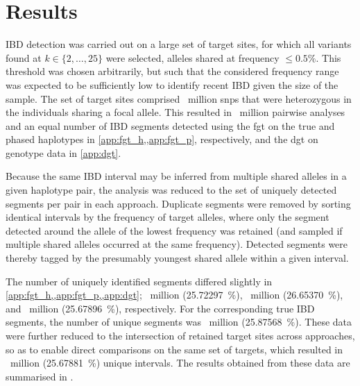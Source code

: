 %
\section{Results}\label{sec:ibd_results}
%

IBD detection was carried out on a large set of target sites, for which all \fk{} variants found at ${k \in \lbrace 2, \ldots, 25 \rbrace}$ were selected, \ie alleles shared at frequency ${\leq 0.5\%}$.
This threshold was chosen arbitrarily, but such that the considered frequency range was expected to be sufficiently low to identify recent IBD given the size of the sample.
The set of target sites comprised ~million \glspl{snp} that were heterozygous in the individuals sharing a focal allele.
This resulted in ~million pairwise analyses and an equal number of IBD segments detected using the \gls{fgt} on the true and phased haplotypes in \cref{app:fgt_h,,app:fgt_p}, respectively, and the \gls{dgt} on genotype data in \cref{app:dgt}.

Because the same IBD interval may be inferred from multiple shared alleles in a given haplotype pair, the analysis was reduced to the set of uniquely detected segments per pair in each approach.
Duplicate segments were removed by sorting identical intervals by the frequency of target alleles, where only the segment detected around the allele of the lowest frequency was retained (and sampled if multiple shared alleles occurred at the same frequency).
Detected segments were thereby tagged by the presumably youngest shared allele within a given interval.

The number of uniquely identified segments differed slightly in \cref{app:fgt_h,,app:fgt_p,,app:dgt};
~million (\SI{25.72297}{\percent}),
~million (\SI{26.65370}{\percent}), and
~million (\SI{25.67896}{\percent}), respectively.
For the corresponding true IBD segments, the number of unique segments was ~million (\SI{25.87568}{\percent}).
These data were further reduced to the intersection of retained target sites across approaches, so as to enable direct comparisons on the same set of targets, which resulted in ~million (\SI{25.67881}{\percent}) unique intervals.
The results obtained from these data are summarised in .

